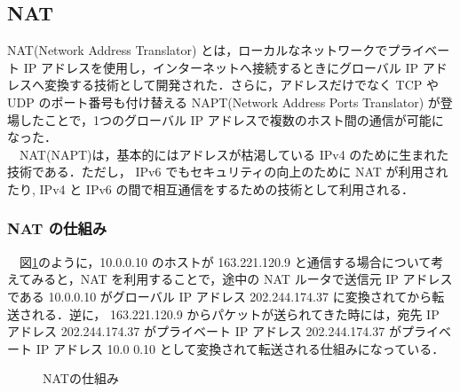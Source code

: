 \documentclass[a4j,titlepage]{jarticle}
\begin{document}
\begin{itemize}
\subsection{NAT}
NAT(Network Address Translator) とは，ローカルなネットワークでプライベート IP アドレスを使用し，インターネットへ接続するときにグローバル IP アドレスへ変換する技術として開発された．さらに，アドレスだけでなく TCP や UDP のポート番号も付け替える NAPT(Network Address Ports Translator) が登場したことで，1つのグローバル IP アドレスで複数のホスト間の通信が可能になった．\\
　NAT(NAPT)は，基本的にはアドレスが枯渇している IPv4 のために生まれた技術である．ただし， IPv6 でもセキュリティの向上のために NAT が利用されたり, IPv4 と IPv6 の間で相互通信をするための技術として利用される．\\

\subsubsection{NAT の仕組み}
　図\ref{fig:nat}のように，10.0.0.10 のホストが 163.221.120.9 と通信する場合について考えてみると，NAT を利用することで，途中の NAT ルータで送信元 IP アドレスである 10.0.0.10 がグローバル IP アドレス 202.244.174.37 に変換されてから転送される．逆に， 163.221.120.9 からパケットが送られてきた時には，宛先 IP アドレス 202.244.174.37 がプライベート IP アドレス 202.244.174.37 がプライベート IP アドレス 10.0 0.10 として変換されて転送される仕組みになっている．

  \begin{figure}[htbp]
    \begin{center}
      \caption{NATの仕組み}
      \label{fig:nat}

   \end{center}
  \end{figure}


\end{itemize}
\end{document}
